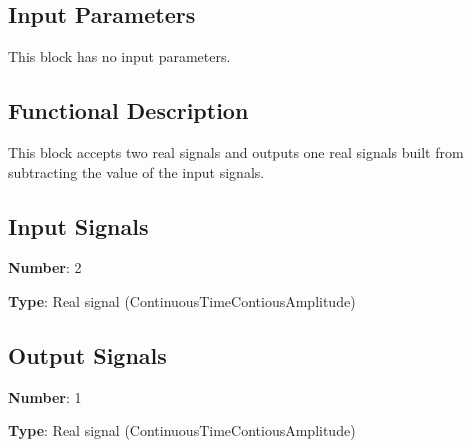 \documentclass[../../sdf/tex/BPSK_system.tex]{subfiles}
\date{}
\begin{document}
\onlyinsubfile{\maketitle}

\subsection*{Input Parameters}

This block has no input parameters.

\subsection*{Functional Description}

This block accepts two real signals and outputs one real signals built from subtracting the value of the input signals.

\subsection*{Input Signals}

\textbf{Number}: 2

\textbf{Type}: Real signal (ContinuousTimeContiousAmplitude)

\subsection*{Output Signals}

\textbf{Number}: 1

\textbf{Type}: Real signal (ContinuousTimeContiousAmplitude)
\end{document}

